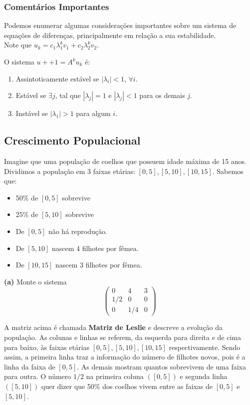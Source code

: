 \documentclass[12pt]{article}
\begin{document}
	\subsubsection{Comentários Importantes}
	
	Podemos enumerar algumas considerações importantes sobre um sistema de equações de diferenças, principalmente em relação a sua estabilidade.\\
	
	Note que $u_k=c_1\lambda_1^kv_1+c_2\lambda_2^kv_2$.
	
	O sistema $u+{+1}=A^ku_k$ é:
	\begin{enumerate}
		\item Assintoticamente estável se $|\lambda_i|<1$, $\forall i$.
		\item Estável se $\exists j$, tal que $|\lambda_j|=1$ e $|\lambda_j|<1$ para os demais $j$.
		\item Instável se $|\lambda_1|>1$ para algum $i$.
	\end{enumerate}
	
	\subsection{Crescimento Populacional}
	
	Imagine que uma população de coelhos que possuem idade máxima de 15 anos. Dividimos a população em 3 faixas etárias: $[0,5],[5,10],[10,15]$. Sabemos que:
	\begin{itemize}
		\item 50\% de $[0,5]$ sobrevive
		\item 25\% de $[5,10]$ sobrevive
		\item De $[0,5]$ não há reprodução.
		\item De $[5,10]$ nascem 4 filhotes por fêmea.
		\item De $[10,15]$ nascem 3 filhotes por fêmea.
	\end{itemize}
	
	\textbf{(a)} Monte o sistema\\
	
	\begin{equation*}
		\begin{pmatrix}
			0 & 4 & 3 \\
			1/2 & 0 & 0 \\
			0 & 1/4 & 0
		\end{pmatrix}
	\end{equation*}
	
	A matriz acima é chamada \textbf{Matriz de Leslie} e descreve a evolução da população. As colunas e linhas se referem, da esquerda para direita e de cima para baixo, às faixas etárias $[0,5],[5,10],[10,15]$ respectivamente. Sendo assim, a primeira linha traz a informação do número de filhotes novos, pois é a linha da faixa de $[0,5]$. As demais mostram quantos sobrevivem de uma faixa para outra. O número $1/2$ na primeira coluna $([0,5])$ e segunda linha $([5,10])$ quer dizer que 50\% dos coelhos vivem entre as faixas de $[0,5]$ e $[5,10]$.\\
	
\end{document}
